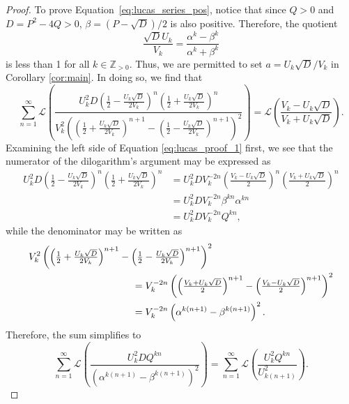 \documentclass[10pt,a4paper]{amsart}
\begin{document}
\begin{proof}
To prove Equation~\eqref{eq:lucas_series_pos}, notice that since $Q > 0$ and $D = P^2 - 4Q > 0$, $\beta = (P-\sqrt{D})/2$ is also positive. 
 Therefore, the quotient
\begin{equation*}
    \frac{\sqrt{D} U_k}{V_k} = \frac{\alpha^k - \beta^k}{\alpha^k + \beta^k}
\end{equation*}
    is less than 1 for all $k \in \mathbb{Z}_{> 0}$.  Thus, we are permitted to set $a = U_k\sqrt{D}/V_k$ in Corollary \ref{cor:main}.  In doing so, we find that
    \begin{equation}
        \sum_{n=1}^{\infty}\mathcal{L}\left(\frac{U^2_k D\left(\frac{1}{2}-\frac{U_k\sqrt{D}}{2V_k}\right)^{n}\left(\frac{1}{2} + \frac{U_k\sqrt{D}}{2 V_k}\right)^{n}}{V^2_k\left(\left(\frac{1}{2}+\frac{U_k\sqrt{D}}{2 V_k}\right)^{n+1}-\left(\frac{1}{2} - \frac{U_k \sqrt{D}}{2 V_k}\right)^{n+1}\right)^2}\right) = \mathcal{L}\left(\frac{V_k-U_k \sqrt{D}}{V_k+U_k\sqrt{D}}\right).\label{eq:lucas_proof_1}
    \end{equation}
    Examining the left side of Equation \eqref{eq:lucas_proof_1} first, we see that the numerator of the dilogarithm's argument may be expressed as
    \begin{align*}
        U^2_k D\left(\tfrac{1}{2}-\tfrac{U_k\sqrt{D}}{2V_k}\right)^{n}\left(\tfrac{1}{2} + \tfrac{U_k\sqrt{D}}{2 V_k}\right)^{n} &= U^2_k D V^{-2n}_k\left(\tfrac{V_k-U_k\sqrt{D}}{2}\right)^{n}\left(\tfrac{V_k+U_k\sqrt{D}}{2}\right)^{n} \\
        &= U^2_k D V^{-2n}_k \beta^{kn} \alpha^{kn} \\
        &= U^2_k D V^{-2n}_k Q^{kn},
    \end{align*}
    while the denominator may be written as
    \begin{align*}
        \MoveEqLeft[12]  V^2_k\left(\left(\tfrac{1}{2}+\tfrac{U_k\sqrt{D}}{2 V_k}\right)^{n+1} -\left(\tfrac{1}{2} - \tfrac{U_k \sqrt{D}}{2  V_k}\right)^{n+1}\right)^2 \\ 
        ={}& V^{-2n}_k\left(\left(\tfrac{V_k + U_k\sqrt{D}}{2}\right)^{n+1}-\left(\tfrac{V_k - U_k \sqrt{D}}{2}\right)^{n+1}\right)^2 \\
        ={}& V^{-2n}_k \left(\alpha^{k(n+1)} - \beta^{k(n+1)}\right)^2.
    \end{align*}
    Therefore, the sum simplifies to
    \begin{equation*}
        \sum_{n=1}^{\infty}\mathcal{L}\left(\frac{U^2_k D Q^{kn}}{(\alpha^{k(n+1)} - \beta^{k(n+1)})^2}\right) =  \sum_{n=1}^{\infty}\mathcal{L}\left(\frac{U^2_k Q^{kn}}{U^2_{k(n+1)}}\right).
    \end{equation*}
    

\end{proof}
\end{document}
